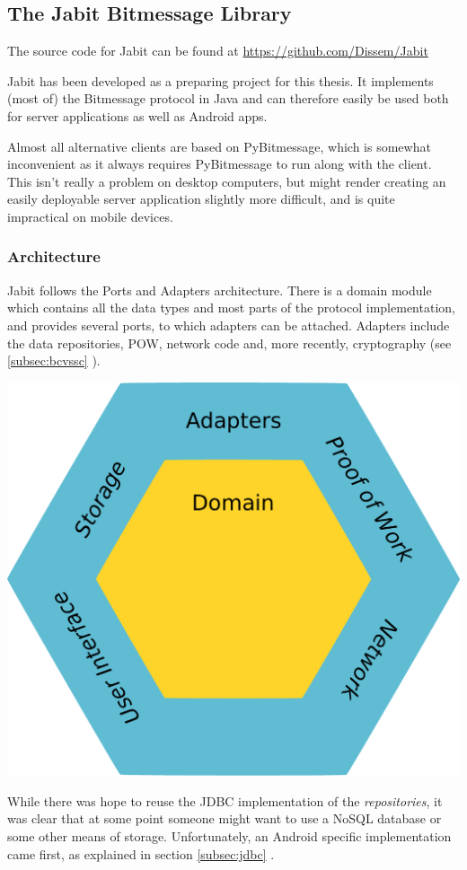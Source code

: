\documentclass{bfh}
\begin{document}
  \subsection{The Jabit Bitmessage Library}
  The source code for Jabit can be found at \url{https://github.com/Dissem/Jabit}

  Jabit has been developed as a preparing project for this thesis. It implements (most of) the Bitmessage protocol in Java and can therefore easily be used both for server applications as well as Android apps.

  Almost all alternative clients are based on PyBitmessage, which is somewhat inconvenient as it always requires PyBitmessage to run along with the client. This isn't really a problem on desktop computers, but might render creating  an easily deployable server application slightly more difficult, and is quite impractical on mobile devices.


  \subsubsection{Architecture}
  Jabit follows the Ports and Adapters architecture. There is a domain module which contains all the data types and most parts of the protocol implementation, and provides several ports, to which adapters can be attached. Adapters include the data repositories, \ac{POW}, network code and, more recently, cryptography (see \ref{subsec:bcvssc} ).

  \begin{center}
    \includegraphics[width=0.5 \textwidth]{images/ports_and_adapters.pdf}
  \end{center}

  While there was hope to reuse the \acs{JDBC} implementation of the \textit{repositories}, it was clear that at some point someone might want to use a \acs{NoSQL} database or some other means of storage. Unfortunately, an Android specific implementation came first, as explained in section \ref{subsec:jdbc} .
\end{document}

